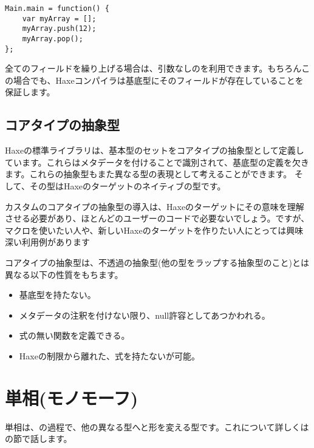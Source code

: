 \begin{lstlisting}
Main.main = function() {
	var myArray = [];
	myArray.push(12);
	myArray.pop();
};
\end{lstlisting}

全てのフィールドを繰り上げる場合は、引数なしのを利用できます。もちろんこの場合でも、Haxeコンパイラは基底型にそのフィールドが存在していることを保証します。



\subsection{コアタイプの抽象型}
\label{types-abstract-core-type}

Haxeの標準ライブラリは、基本型のセットをコアタイプの抽象型として定義しています。これらはメタデータを付けることで識別されて、基底型の定義を欠きます。これらの抽象型もまた異なる型の表現として考えることができます。
そして、その型はHaxeのターゲットのネイティブの型です。

カスタムのコアタイプの抽象型の導入は、Haxeのターゲットにその意味を理解させる必要があり、ほとんどのユーザーのコードで必要ないでしょう。ですが、マクロを使いたい人や、新しいHaxeのターゲットを作りたい人にとっては興味深い利用例があります

コアタイプの抽象型は、不透過の抽象型(他の型をラップする抽象型のこと)とは異なる以下の性質をもちます。

\begin{itemize}
	\item 基底型を持たない。
	\item {}メタデータの注釈を付けない限り、null許容としてあつかわれる。
	\item 式の無い関数を定義できる。
	\item Haxeの制限から離れた、式を持たないが可能。
\end{itemize}



\section{単相(モノモーフ)}
\label{types-monomorph}

単相は、の過程で、他の異なる型へと形を変える型です。これについて詳しくはの節で話します。
